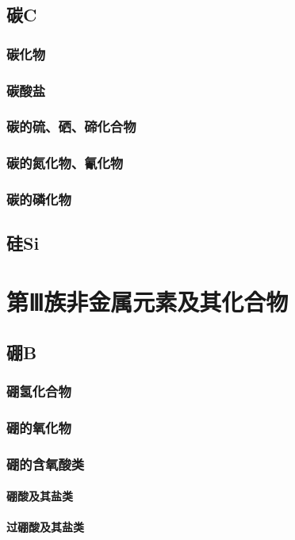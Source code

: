 \documentclass[UTF8]{../03-Chemistry}
\begin{document}
    \subsection{碳C}
        \subsubsection{碳化物}
        \subsubsection{碳酸盐}
        \subsubsection{碳的硫、硒、碲化合物}
        \subsubsection{碳的氮化物、氰化物}
        \subsubsection{碳的磷化物}

    \subsection{硅Si}
\section{第Ⅲ族非金属元素及其化合物}
    \subsection{硼B}
        \subsubsection{硼氢化合物}
        \subsubsection{硼的氧化物}
        \subsubsection{硼的含氧酸类}
            \paragraph{硼酸及其盐类}
            \paragraph{过硼酸及其盐类}
\end{document}
